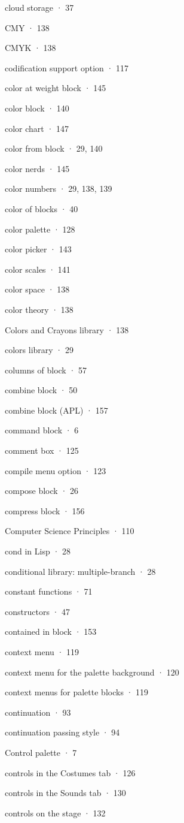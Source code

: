 \documentclass[
  letterpaper,
]{book}
\begin{document}
cloud storage · 37

CMY · 138

CMYK · 138

codification support option · 117

color at weight block · 145

color block · 140

color chart · 147

color from block · 29, 140

color nerds · 145

color numbers · 29, 138, 139

color of blocks · 40

color palette · 128

color picker · 143

color scales · 141

color space · 138

color theory · 138

Colors and Crayons library · 138

colors library · 29

columns of block · 57

combine block · 50

combine block (APL) · 157

command block · 6

comment box · 125

compile menu option · 123

compose block · 26

compress block · 156

Computer Science Principles · 110

cond in Lisp · 28

conditional library: multiple-branch · 28

constant functions · 71

constructors · 47

contained in block · 153

context menu · 119

context menu for the palette background · 120

context menus for palette blocks · 119

continuation · 93

continuation passing style · 94

Control palette · 7

controls in the Costumes tab · 126

controls in the Sounds tab · 130

controls on the stage · 132
\end{document}
